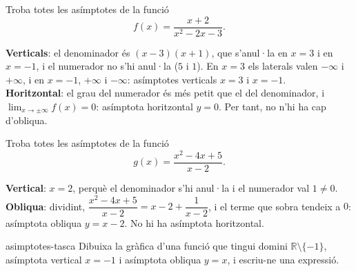 \begin{apartats}

Troba totes les asímptotes de la funció
\[
f(x)=\frac{x+2}{x^2-2x-3} .
\]

\begin{solucio}
\textbf{Verticals}: el denominador és $(x-3)(x+1)$, que s'anul·la en $x=3$ i en $x=-1$, i el numerador
no s'hi anul·la ($5$ i $1$). En $x=3$ els laterals valen $-\infty$ i $+\infty$, i en $x=-1$, $+\infty$
i $-\infty$: asímptotes verticals $\boxed{x=3}$ i $\boxed{x=-1}$.\\
\textbf{Horitzontal}: el grau del numerador és més petit que el del denominador, i
$\lim_{x\to\pm\infty}f(x)=0$: asímptota horitzontal $\boxed{y=0}$. Per tant, no n'hi ha cap d'obliqua.
\end{solucio}

\begin{nomesllarg}
Troba totes les asímptotes de la funció
\[
g(x)=\frac{x^2-4x+5}{x-2} .
\]

\begin{solucio}
\textbf{Vertical}: $x=2$, perquè el denominador s'hi anul·la i el numerador val $1\neq0$.\\
\textbf{Obliqua}: dividint, $\dfrac{x^2-4x+5}{x-2}=x-2+\dfrac{1}{x-2}$, i el terme que sobra tendeix a
$0$: asímptota obliqua $\boxed{y=x-2}$. No hi ha asímptota horitzontal.
\end{solucio}
\end{nomesllarg}

\begin{tria}{asimptotes-tasca}
Dibuixa la gràfica d'una funció que tingui domini $\mathbb{R}\setminus\{-1\}$, asímptota vertical
$x=-1$ i asímptota obliqua $y=x$, i escriu-ne una expressió.


\end{tria}
\end{apartats}
